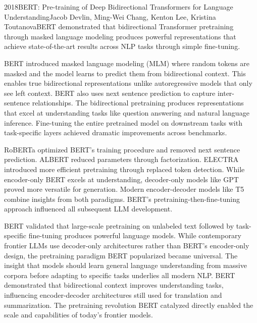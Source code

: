 
\begin{papersummary}{2018}{BERT: Pre-training of Deep Bidirectional Transformers for Language Understanding}{Jacob Devlin, Ming-Wei Chang, Kenton Lee, Kristina Toutanova}{BERT demonstrated that bidirectional Transformer pretraining through masked language modeling produces powerful representations that achieve state-of-the-art results across NLP tasks through simple fine-tuning.}

BERT introduced masked language modeling (MLM) where random tokens are masked and the model learns to predict them from bidirectional context. This enables true bidirectional representations unlike autoregressive models that only see left context. BERT also uses next sentence prediction to capture inter-sentence relationships. The bidirectional pretraining produces representations that excel at understanding tasks like question answering and natural language inference. Fine-tuning the entire pretrained model on downstream tasks with task-specific layers achieved dramatic improvements across benchmarks.

RoBERTa optimized BERT's training procedure and removed next sentence prediction. ALBERT reduced parameters through factorization. ELECTRA introduced more efficient pretraining through replaced token detection. While encoder-only BERT excels at understanding, decoder-only models like GPT proved more versatile for generation. Modern encoder-decoder models like T5 combine insights from both paradigms. BERT's pretraining-then-fine-tuning approach influenced all subsequent LLM development.

BERT validated that large-scale pretraining on unlabeled text followed by task-specific fine-tuning produces powerful language models. While contemporary frontier LLMs use decoder-only architectures rather than BERT's encoder-only design, the pretraining paradigm BERT popularized became universal. The insight that models should learn general language understanding from massive corpora before adapting to specific tasks underlies all modern NLP. BERT demonstrated that bidirectional context improves understanding tasks, influencing encoder-decoder architectures still used for translation and summarization. The pretraining revolution BERT catalyzed directly enabled the scale and capabilities of today's frontier models.

\end{papersummary}
